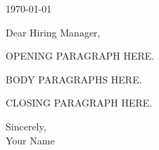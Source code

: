\documentclass[10pt,a4paper]{article}
\begin{document}
\today

\vspace{12pt}

Dear Hiring Manager,

OPENING PARAGRAPH HERE.

BODY PARAGRAPHS HERE.

CLOSING PARAGRAPH HERE.

\vspace{12pt}

Sincerely, \\
Your Name
\end{document}

